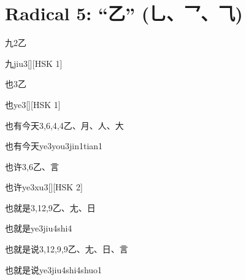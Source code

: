 
\section*{Radical 5: ``⼄'' (乚、乛、⺄)}

\begin{entry}{九}{2}{⼄}
  \begin{phonetics}{九}{jiu3}[][HSK 1]
  \end{phonetics}
\end{entry}

\begin{entry}{也}{3}{⼄}
  \begin{phonetics}{也}{ye3}[][HSK 1]
  \end{phonetics}
\end{entry}

\begin{entry}{也有今天}{3,6,4,4}{⼄、⽉、⼈、⼤}
  \begin{phonetics}{也有今天}{ye3you3jin1tian1}
  \end{phonetics}
\end{entry}

\begin{entry}{也许}{3,6}{⼄、⾔}
  \begin{phonetics}{也许}{ye3xu3}[][HSK 2]
  \end{phonetics}
\end{entry}

\begin{entry}{也就是}{3,12,9}{⼄、⼪、⽇}
  \begin{phonetics}{也就是}{ye3jiu4shi4}
  \end{phonetics}
\end{entry}

\begin{entry}{也就是说}{3,12,9,9}{⼄、⼪、⽇、⾔}
  \begin{phonetics}{也就是说}{ye3jiu4shi4shuo1}
  \end{phonetics}
\end{entry}

